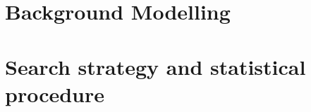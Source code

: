 \clearpage
\section{Background Modelling}
\label{Section:Chapter6_Background_Modelling}

\section{Search strategy and statistical procedure}







